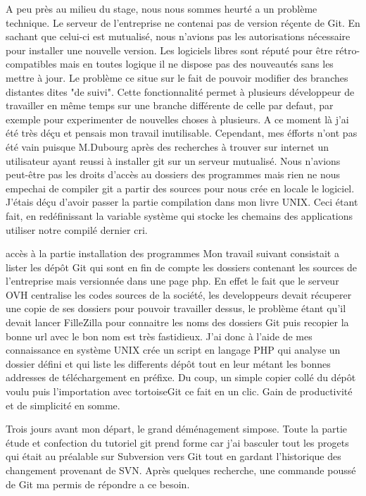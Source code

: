 A peu près au milieu du stage, nous nous sommes heurté a un problème technique.
Le serveur de l'entreprise ne contenai pas de version réçente de Git.  En
sachant que celui-ci est mutualisé, nous n'avions pas les autorisations
nécessaire pour installer une nouvelle version. Les logiciels libres sont
réputé pour être rétro-compatibles mais en toutes logique il ne dispose pas des
nouveautés sans les mettre à jour. Le problème ce situe sur le fait de pouvoir
modifier des branches distantes dites "de suivi". Cette fonctionnalité permet à
plusieurs développeur de travailler en même temps sur une branche différente de
celle par defaut, par exemple pour experimenter de nouvelles choses à
plusieurs. A ce moment là j'ai été très déçu et pensais mon travail
inutilisable. Cependant, mes éfforts n'ont pas été vain puisque M.Dubourg après
des recherches à trouver sur internet un utilisateur ayant reussi à installer
git sur un serveur mutualisé. Nous n'avions peut-être pas les droits d'accès au
dossiers des programmes mais rien ne nous empechai de compiler git a partir des
sources pour nous crée en locale le logiciel. J'étais déçu d'avoir passer la
partie compilation dans mon livre UNIX.  Ceci étant fait, en redéfinissant la
variable système qui stocke les chemains des applications utiliser notre
compilé dernier cri.

accès à la partie installation des programmes Mon travail suivant consistait a
lister les dépôt Git qui sont en fin de compte les dossiers contenant les
sources de l'entreprise mais versionnée dans une page php. En effet le fait que
le serveur OVH centralise les codes sources de la société, les developpeurs
devait récuperer une copie de ses dossiers pour pouvoir travailler dessus, le
problème étant qu'il devait lancer FilleZilla pour connaitre les noms des
dossiers Git puis recopier la bonne url avec le bon nom est très fastidieux.
J'ai donc à l'aide de mes connaissance en système UNIX crée un script en
langage PHP qui analyse un dossier défini et qui liste les differents dépôt
tout en leur métant les bonnes addresses de téléchargement en préfixe. Du coup,
un simple copier collé du dépôt voulu puis l'importation avec tortoiseGit ce
fait en un clic. Gain de productivité et de simplicité en somme.

Trois jours avant mon départ, le grand déménagement simpose. Toute la partie
étude et confection du tutoriel git prend forme car j'ai basculer tout les
progets qui était au préalable sur Subversion vers Git tout en gardant
l'historique des changement provenant de SVN. Après quelques recherche, une
commande poussé de Git ma permis de répondre a ce besoin.

